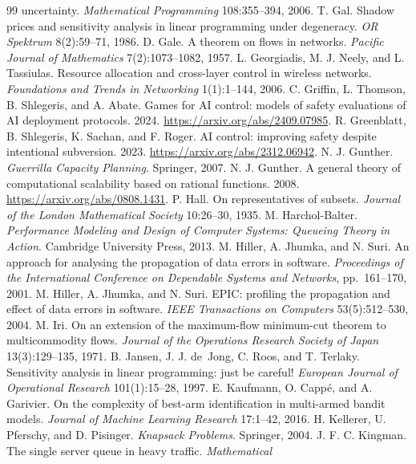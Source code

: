 \documentclass[11pt]{article}
\theoremstyle{definition}
\theoremstyle{remark}
\begin{document}
\begin{thebibliography}{99}
uncertainty. \emph{Mathematical Programming} 108:355--394, 2006.
 T. Gal. Shadow prices and sensitivity analysis in linear programming under degeneracy.
\emph{OR Spektrum} 8(2):59--71, 1986.
 D. Gale. A theorem on flows in networks. \emph{Pacific Journal of Mathematics}
7(2):1073--1082, 1957.
 L. Georgiadis, M. J. Neely, and L. Tassiulas. Resource allocation and
cross-layer control in wireless networks. \emph{Foundations and Trends in Networking} 1(1):1--144,
2006.
 C. Griffin, L. Thomson, B. Shlegeris, and A. Abate. Games for AI control: models of
safety evaluations of AI deployment protocols. 2024. \url{https://arxiv.org/abs/2409.07985}.
 R. Greenblatt, B. Shlegeris, K. Sachan, and F. Roger. AI control: improving
safety despite intentional subversion. 2023. \url{https://arxiv.org/abs/2312.06942}.
 N. J. Gunther. \emph{Guerrilla Capacity Planning}. Springer, 2007.
 N. J. Gunther. A general theory of computational scalability based on rational
functions. 2008. \url{https://arxiv.org/abs/0808.1431}.
 P. Hall. On representatives of subsets. \emph{Journal of the London Mathematical
Society} 10:26--30, 1935.
 M. Harchol-Balter. \emph{Performance Modeling and Design of Computer Systems:
Queueing Theory in Action}. Cambridge University Press, 2013.
 M. Hiller, A. Jhumka, and N. Suri. An approach for analysing the propagation of
data errors in software. \emph{Proceedings of the International Conference on Dependable Systems and
Networks}, pp.~161--170, 2001.
 M. Hiller, A. Jhumka, and N. Suri. EPIC: profiling the propagation and effect of
data errors in software. \emph{IEEE Transactions on Computers} 53(5):512--530, 2004.
 M. Iri. On an extension of the maximum-flow minimum-cut theorem to multicommodity
flows. \emph{Journal of the Operations Research Society of Japan} 13(3):129--135, 1971.
 B. Jansen, J. J. de~Jong, C. Roos, and T. Terlaky. Sensitivity analysis in linear
programming: just be careful! \emph{European Journal of Operational Research} 101(1):15--28, 1997.
 E. Kaufmann, O. Capp\'e, and A. Garivier. On the complexity of best-arm
identification in multi-armed bandit models. \emph{Journal of Machine Learning Research} 17:1--42,
2016.
 H. Kellerer, U. Pferschy, and D. Pisinger. \emph{Knapsack Problems}. Springer,
2004.
 J. F. C. Kingman. The single server queue in heavy traffic. \emph{Mathematical
}
\end{thebibliography}
\end{document}
